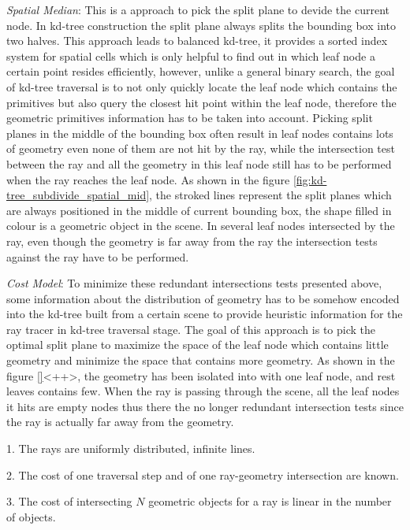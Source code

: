\emph{Spatial Median}: This is a \mynaive approach to pick the split plane to devide the current node. In kd-tree construction the split plane always splits the bounding box into two halves. This approach leads to balanced kd-tree, it provides a sorted index system for spatial cells which is only helpful to find out in which leaf node a certain point resides efficiently, however, unlike a general binary search, the goal of kd-tree traversal is to not only quickly locate the leaf node which contains the primitives but also query the closest hit point within the leaf node, therefore the geometric primitives information has to be taken into account. Picking split planes in the middle of the bounding box often result in leaf nodes contains lots of geometry even none of them are not hit by the ray, while the intersection test between the ray and all the geometry in this leaf node still has to be performed when the ray reaches the leaf node. As shown in the figure \ref{fig:kd-tree_subdivide_spatial_mid}, the stroked lines represent the split planes which are always positioned in the middle of current bounding box, the shape filled in colour is a geometric object in the scene. In several leaf nodes intersected by the ray, even though the geometry is far away from the ray the intersection tests against the ray have to be performed.

\emph{Cost Model}: To minimize these redundant intersections tests presented above, some information about the distribution of geometry has to be somehow encoded into the kd-tree built from a certain scene to provide heuristic information for the ray tracer in kd-tree traversal stage. The goal of this approach is to pick the optimal split plane to maximize the space of the leaf node which contains little geometry and minimize the space that contains more geometry. As shown in the figure \ref{}<++>, the geometry has been isolated into with one leaf node, and rest leaves contains few. When the ray is passing through the scene, all the leaf nodes it hits are empty nodes thus there the no longer redundant intersection tests since the ray is actually far away from the geometry.  


1. The rays are uniformly distributed, infinite lines.

2. The cost of one traversal step and of one ray-geometry intersection are known.

3. The cost of intersecting \(N\) geometric objects for a ray is linear in the number of objects.

